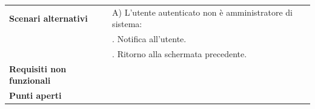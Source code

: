 \documentclass[a4paper]{article}
\begin{document}
\begin{table}[ht!]
\begin{center}
\begin{tabulary}{1\textwidth}{l|L}
        \hline
        \textbf{Scenari alternativi} & A) L'utente autenticato non è amministratore di sistema: \\
                                     & . Notifica all'utente.\\
                                     & . Ritorno alla schermata precedente.\\
        \hline
        \textbf{Requisiti non funzionali} & \\
        \hline
        \textbf{Punti aperti} & \\
        \hline
    \end{tabulary}
  \end{center}
\end{table}

\end{document}
